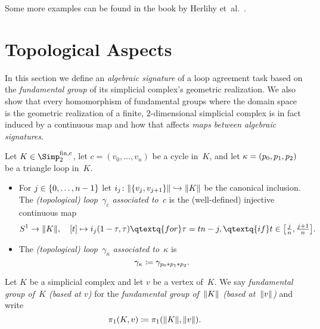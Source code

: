 Some more examples can be found in the book by
Herlihy et~al.~\cite[Sec.~5.6.3]{bookc:herlihyetal13}.

\section{Topological Aspects}
In this section we define an \emph{algebraic signature} of a loop agreement task
based on the \emph{fundamental group} of its simplicial complex's geometric
realization. We also show that every homomorphism of fundamental groups where
the domain space is the geometric realization of a finite, $2$-dimensional
simplicial complex is in fact induced by a continuous map and how that affects
\emph{maps between algebraic signatures}.

\begin{thDef}\hfill
    \label{ch3:def:assoctopoloop}
    Let $K\in\finSimp$, let $c=(v_0,\dots,v_n)$ be a cycle in~$K$,
    and let $\kappa=(p_0,p_1,p_2)$ be a triangle loop in~$K$.
    \begin{itemize}
        \item
            For $j\in\{0,\ldots,n-1\}$ let $i_j\colon\lVert\{v_j,v_{j+1}\}\rVert
            \hookrightarrow\lVert K\rVert$ be the canonical inclusion.
            The \emph{(topological) loop~$\gamma_c$ associated to~$c$} is the
            (well-defined) injective continuous map
            \[
                S^1\to\geom K, \quad
                [t]\mapsto i_j(1-\tau,\tau) \qtextq{for} \tau=tn-j,
                    \qtextq{if} t\in\bigl[\tfrac{j}{n}, \tfrac{j+1}{n}\bigr]
            . \]
            
        \item
            The \emph{(topological) loop~$\gamma_\kappa$ associated to~$\kappa$}
            is
            \[ \gamma_\kappa \coloneqq \gamma_{p_0\ast p_1\ast p_2}  . \]
    \end{itemize}
\end{thDef}

\begin{thConvention}
    Let $K$ be a simplicial complex and let $v$ be a vertex of~$K$. We say
    \emph{fundamental group of~$K$ (based at $v$)} for the \emph{fundamental
    group of~$\lVert K\rVert$ (based at~$\lVert v\rVert$)} and write
    \[ \pi_1(K,v) \coloneqq \pi_1(\lVert K\rVert, \lVert v\rVert) . \]
\end{thConvention}

